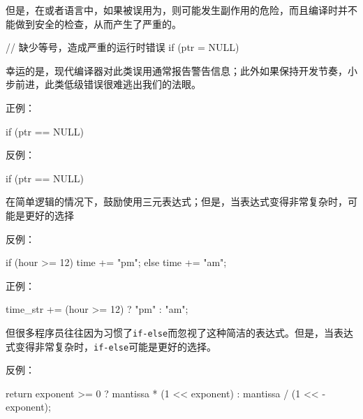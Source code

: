 \begin{content}
但是，在\clang{}或者\cpp{}语言中，如果\ascii{==}被误用为\ascii{=}，则可能发生副作用的危险，而且编译时并不能做到安全的检查，从而产生了严重的。

\begin{leftbar}
\begin{c++}
// 缺少等号，造成严重的运行时错误
if (ptr = NULL)
\end{c++}
\end{leftbar}

幸运的是，现代编译器对此类误用通常报告警告信息；此外如果保持开发节奏，小步前进，此类低级错误很难逃出我们的法眼。

正例：
\begin{leftbar}
\begin{c++}
if (ptr == NULL)
\end{c++}
\end{leftbar}

反例：
\begin{leftbar}
\begin{c++}
if (ptr == NULL)
\end{c++}
\end{leftbar}


\begin{regulation}
在简单逻辑的情况下，鼓励使用三元表达式；但是，当表达式变得非常复杂时，可能是更好的选择
\end{regulation}

反例：
\begin{leftbar}
\begin{c++}
if (hour >= 12) 
{
    time += "pm";
} 
else 
{
    time += "am";
}
\end{c++}
\end{leftbar}

正例：
\begin{leftbar}
\begin{c++}
time_str += (hour >= 12) ? "pm" : "am";
\end{c++}
\end{leftbar}

但很多程序员往往因为习惯了\texttt{if-else}而忽视了这种简洁的表达式。但是，当表达式变得非常复杂时，\texttt{if-else}可能是更好的选择。

反例：
\begin{leftbar}
\begin{c++}
return exponent >= 0 ? mantissa * (1 << exponent) : mantissa / (1 << -exponent);
\end{c++}
\end{leftbar}


\end{content}

